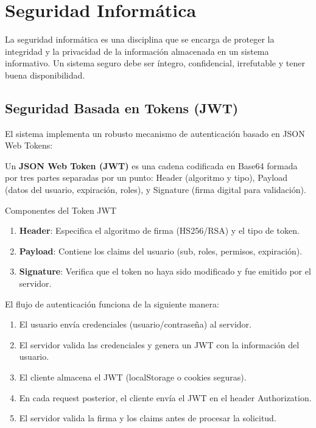 \section{Seguridad Informática}

La seguridad informática es una disciplina que se encarga de proteger la integridad y la privacidad de la información almacenada en un sistema informativo. Un sistema seguro debe ser íntegro, confidencial, irrefutable y tener buena disponibilidad.


\subsection{Seguridad Basada en Tokens (JWT)}

El sistema implementa un robusto mecanismo de autenticación basado en JSON Web Tokens:

\begin{definicion}
Un \textbf{JSON Web Token (JWT)} es una cadena codificada en Base64 formada por tres partes separadas por un punto: Header (algoritmo y tipo), Payload (datos del usuario, expiración, roles), y Signature (firma digital para validación).
\end{definicion}


\begin{caja}{Componentes del Token JWT}
\begin{enumerate}
\item \textbf{Header}: Especifica el algoritmo de firma (HS256/RSA) y el tipo de token.
\item \textbf{Payload}: Contiene los claims del usuario (sub, roles, permisos, expiración).
\item \textbf{Signature}: Verifica que el token no haya sido modificado y fue emitido por el servidor.
\end{enumerate}
\end{caja}

El flujo de autenticación funciona de la siguiente manera:

\begin{enumerate}
\item El usuario envía credenciales (usuario/contraseña) al servidor.
\item El servidor valida las credenciales y genera un JWT con la información del usuario.
\item El cliente almacena el JWT (localStorage o cookies seguras).
\item En cada request posterior, el cliente envía el JWT en el header Authorization.
\item El servidor valida la firma y los claims antes de procesar la solicitud.
\end{enumerate}

